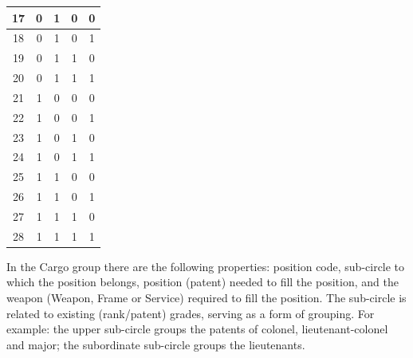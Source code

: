 \begin{table}[htb!]
\begin{center}
\begin{tabular}{ccccc}
17               & 0              & 1                    & 0                 & 0               \\ \hline
18               & 0              & 1                    & 0                 & 1               \\ \hline
19               & 0              & 1                    & 1                 & 0               \\ \hline
20               & 0              & 1                    & 1                 & 1               \\ \hline
21               & 1              & 0                    & 0                 & 0               \\ \hline
22               & 1              & 0                    & 0                 & 1               \\ \hline
23               & 1              & 0                    & 1                 & 0               \\ \hline
24               & 1              & 0                    & 1                 & 1               \\ \hline
25               & 1              & 1                    & 0                 & 0               \\ \hline
26               & 1              & 1                    & 0                 & 1               \\ \hline
27               & 1              & 1                    & 1                 & 0               \\ \hline
28               & 1              & 1                    & 1                 & 1               \\ \hline
		\end{tabular}
	\end{center}
\end{table}


In the Cargo group there are the following properties: position code, sub-circle to which the position belongs, position (patent) needed to fill the position, and the weapon (Weapon, Frame or Service) required to fill the position. The sub-circle is related to existing (rank/patent) grades, serving as a form of grouping. For example: the upper sub-circle groups the patents of colonel, lieutenant-colonel and major; the subordinate sub-circle groups the lieutenants.


